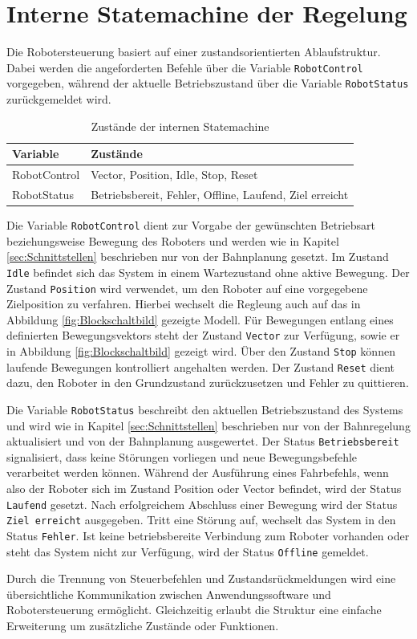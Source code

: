 \section{Interne Statemachine der Regelung}
Die Robotersteuerung basiert auf einer zustandsorientierten Ablaufstruktur. Dabei werden die angeforderten Befehle über die Variable \texttt{RobotControl} vorgegeben, während der aktuelle Betriebszustand über die Variable \texttt{RobotStatus} zurückgemeldet wird.
\begin{table}[H]
    \centering
    \caption{Zustände der internen Statemachine}
    \begin{tabular}{l|l}
    \hline
    Variable & Zustände \\
    \hline
    RobotControl &
    Vector, Position, Idle, Stop, Reset \\
    RobotStatus &
    Betriebsbereit, Fehler, Offline, Laufend, Ziel erreicht \\
    \hline
    \end{tabular}
\end{table}
Die Variable \texttt{RobotControl} dient zur Vorgabe der gewünschten Betriebsart beziehungsweise Bewegung des Roboters und werden wie in Kapitel \ref{sec:Schnittstellen} beschrieben nur von der Bahnplanung gesetzt. Im Zustand \texttt{Idle} befindet sich das System in einem Wartezustand ohne aktive Bewegung. Der Zustand \texttt{Position} wird verwendet, um den Roboter auf eine vorgegebene Zielposition zu verfahren. Hierbei wechselt die Regleung auch auf das in Abbildung \ref{fig:Blockschaltbild} gezeigte Modell. Für Bewegungen entlang eines definierten Bewegungsvektors steht der Zustand \texttt{Vector} zur Verfügung, sowie er in Abbildung \ref{fig:Blockschaltbild} gezeigt wird. Über den Zustand \texttt{Stop} können laufende Bewegungen kontrolliert angehalten werden. Der Zustand \texttt{Reset} dient dazu, den Roboter in den Grundzustand zurückzusetzen und Fehler zu quittieren.

Die Variable \texttt{RobotStatus} beschreibt den aktuellen Betriebszustand des Systems und wird wie in Kapitel \ref{sec:Schnittstellen} beschrieben nur von der Bahnregelung aktualisiert und von der Bahnplanung ausgewertet. Der Status \texttt{Betriebsbereit} signalisiert, dass keine Störungen vorliegen und neue Bewegungsbefehle verarbeitet werden können. Während der Ausführung eines Fahrbefehls, wenn also der Roboter sich im Zustand Position oder Vector befindet, wird der Status \texttt{Laufend} gesetzt. Nach erfolgreichem Abschluss einer Bewegung wird der Status \texttt{Ziel erreicht} ausgegeben. Tritt eine Störung auf, wechselt das System in den Status \texttt{Fehler}. Ist keine betriebsbereite Verbindung zum Roboter vorhanden oder steht das System nicht zur Verfügung, wird der Status \texttt{Offline} gemeldet.

Durch die Trennung von Steuerbefehlen und Zustandsrückmeldungen wird eine übersichtliche Kommunikation zwischen Anwendungssoftware und Robotersteuerung ermöglicht. Gleichzeitig erlaubt die Struktur eine einfache Erweiterung um zusätzliche Zustände oder Funktionen.